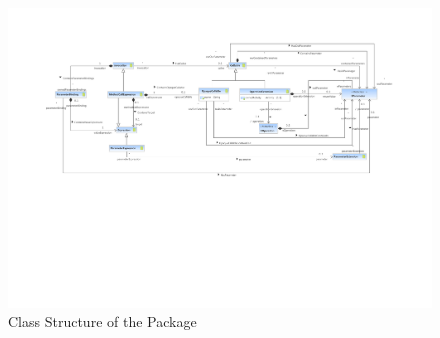 %
%


\begin{figure}[htbp]
  \centering
  \includegraphics[width=\textheight,angle=90]{figures/A_technical-reference/packages/storydiagrams_calls_expressions/storydiagrams-calls-expressions}
  \caption{Class Structure of the  Package}
  \label{fig:MM:calls:expressions}
\end{figure}